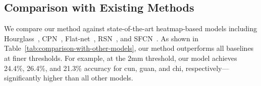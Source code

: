 \documentclass[twocolumn]{article}
\begin{document}
\begin{table}[htbp!]
    \centering
    \caption{Comparison Between Regression-Based and Heatmap-Based Methods}
    \label{tab:comparison-regression-vs-heatmap}
\end{table}


\subsection{Comparison with Existing Methods}
We compare our method against state-of-the-art heatmap-based models including Hourglass~\cite{newell2016}, CPN~\cite{chen2018}, Flat-net~\cite{eslami2020}, RSN~\cite{cai2020}, and SFCN~\cite{yang2022}. As shown in Table~\ref{tab:comparison-with-other-models}, our method outperforms all baselines at finer thresholds. For example, at the 2mm threshold, our model achieves 24.4\%, 26.4\%, and 21.3\% accuracy for cun, guan, and chi, respectively—significantly higher than all other models.
\end{document}
